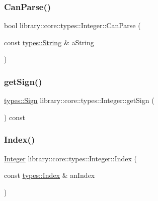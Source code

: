 \subsubsection{\texorpdfstring{Can\+Parse()}{CanParse()}\hspace{0.1cm}{\footnotesize\ttfamily [2/2]}}
{\footnotesize\ttfamily bool library\+::core\+::types\+::\+Integer\+::\+Can\+Parse (\begin{DoxyParamCaption}\item[{const \hyperlink{classlibrary_1_1core_1_1types_1_1_string}{types\+::\+String} \&}]{a\+String }\end{DoxyParamCaption})\hspace{0.3cm}{\ttfamily [static]}}

\mbox{\label{classlibrary_1_1core_1_1types_1_1_integer_abe567cca5d1e448329195df5d16d48e6}} 
\subsubsection{\texorpdfstring{get\+Sign()}{getSign()}}
{\footnotesize\ttfamily \hyperlink{namespacelibrary_1_1core_1_1types_a06d9eaa410d43a0fa3f383040618e87d}{types\+::\+Sign} library\+::core\+::types\+::\+Integer\+::get\+Sign (\begin{DoxyParamCaption}{ }\end{DoxyParamCaption}) const}

\mbox{\label{classlibrary_1_1core_1_1types_1_1_integer_a902099e195d18a7d843c7cdd9a4f349c}} 
\subsubsection{\texorpdfstring{Index()}{Index()}}
{\footnotesize\ttfamily \hyperlink{classlibrary_1_1core_1_1types_1_1_integer}{Integer} library\+::core\+::types\+::\+Integer\+::\+Index (\begin{DoxyParamCaption}\item[{const \hyperlink{namespacelibrary_1_1core_1_1types_ad87eeb821d7067ec94e06ed1980d6350}{types\+::\+Index} \&}]{an\+Index }\end{DoxyParamCaption})\hspace{0.3cm}{\ttfamily [static]}}

